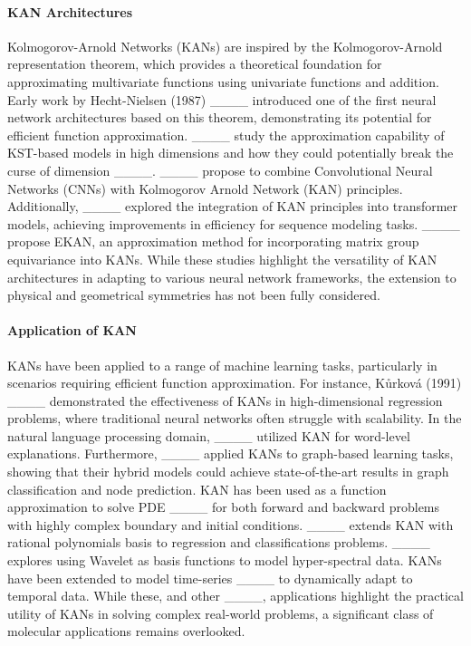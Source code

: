 \paragraph{KAN Architectures}
Kolmogorov-Arnold Networks (KANs) are inspired by the Kolmogorov-Arnold representation theorem, which provides a theoretical foundation for approximating multivariate functions using univariate functions and addition. Early work by Hecht-Nielsen (1987) ____ introduced one of the first neural network architectures based on this theorem, demonstrating its potential for efficient function approximation. 
____ study the approximation capability of KST-based models in high dimensions and how they could potentially break the curse of dimension ____. 
____ propose to combine  Convolutional Neural Networks (CNNs) with Kolmogorov Arnold Network (KAN) principles.
Additionally, 
____
explored the integration of KAN principles into transformer models, achieving improvements in efficiency for sequence modeling tasks. 
____ propose EKAN, an approximation method for incorporating matrix group equivariance into KANs. While these studies highlight the versatility of KAN architectures in adapting to various neural network frameworks, the extension to physical and geometrical symmetries has not been fully considered.

\paragraph{Application of KAN}
KANs have been applied to a range of machine learning tasks, particularly in scenarios requiring efficient function approximation. For instance, Kůrková (1991) ____ demonstrated the effectiveness of KANs in high-dimensional regression problems, where traditional neural networks often struggle with scalability. In the natural language processing domain, ____ utilized KAN for word-level explanations.  
Furthermore, 
____
applied KANs to graph-based learning tasks, showing that their hybrid models could achieve state-of-the-art results in graph classification and node prediction. 
KAN has been used as a function approximation to solve PDE ____ for both forward and backward problems with highly complex boundary and initial conditions.
____ extends KAN with rational polynomials basis to regression and classifications problems. ____ explores using Wavelet as basis functions to model hyper-spectral data. KANs have been extended to model time-series ____ to dynamically adapt to temporal data. 
While these, and other ____,  applications highlight the practical utility of KANs in solving complex real-world problems, a significant class of molecular applications remains overlooked. 

